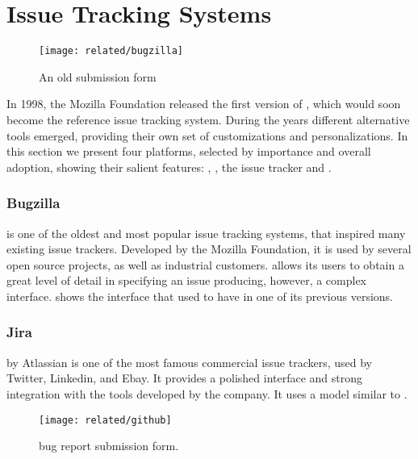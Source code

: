 \section{Issue Tracking Systems}\label{sec:related-bugtrackers}

\begin{figure}[t]
\centering
  \texttt{[image: related/bugzilla]}
  \caption{An old \bzilla submission form}
  \label{fig:bugzilla-interface}
\end{figure}

In 1998, the Mozilla Foundation released the first version of \bzilla, which would soon become the reference issue tracking system.
During the years different alternative tools emerged, providing their own set of customizations and personalizations.
In this section we present four platforms, selected by importance and overall adoption, showing their salient features: \bzilla, \jira, the \gth issue tracker and \fbz.


\subsubsection{Bugzilla}
\bzilla{} is one of the oldest and most popular issue tracking systems, that inspired many existing issue trackers. Developed by the Mozilla Foundation, it is used by several open source projects, as well as industrial customers. \bzilla allows its users to obtain a great level of detail in specifying an issue producing, however, a complex interface.
 shows the interface that \bzilla used to have in one of its previous versions.


\subsubsection{Jira}
\jira{} by Atlassian is one of the most famous commercial issue trackers, used by Twitter, Linkedin, and Ebay. It provides a polished interface and strong integration with the tools developed by the company. It uses a model similar to \bzilla.

\begin{figure}[t]
\centering
 \texttt{[image: related/github]}
 \caption{\gth bug report submission form.}
 \label{fig:github-interface}
\end{figure}


